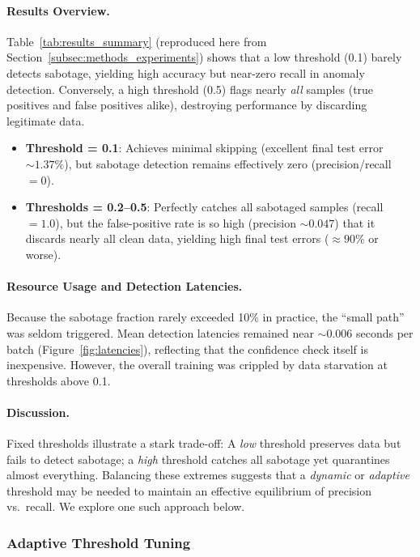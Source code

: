 \documentclass[12pt]{article}
\begin{document}
\paragraph{Results Overview.}
Table~\ref{tab:results_summary} (reproduced here from Section~\ref{subsec:methods_experiments})
shows that a low threshold (0.1) barely detects sabotage, yielding high accuracy
but near-zero recall in anomaly detection. Conversely, a high threshold (0.5)
flags nearly \emph{all} samples (true positives and false positives alike),
destroying performance by discarding legitimate data.

\begin{itemize}
  \item \textbf{Threshold = 0.1}:
    Achieves minimal skipping (excellent final test error $\sim1.37\%$),
    but sabotage detection remains effectively zero (precision/recall $=0$).
  \item \textbf{Thresholds = 0.2--0.5}:
    Perfectly catches all sabotaged samples (recall $=1.0$),
    but the false-positive rate is so high (precision $\sim0.047$)
    that it discards nearly all clean data,
    yielding high final test errors ($\approx 90\%$ or worse).
\end{itemize}

\paragraph{Resource Usage and Detection Latencies.}
Because the sabotage fraction rarely exceeded 10\% in practice, the
“small path” was seldom triggered. Mean detection latencies remained near
$\sim0.006$ seconds per batch (Figure~\ref{fig:latencies}), reflecting that
the confidence check itself is inexpensive. However, the overall training
was crippled by data starvation at thresholds above 0.1.

\paragraph{Discussion.}
Fixed thresholds illustrate a stark trade-off: A \emph{low} threshold preserves
data but fails to detect sabotage; a \emph{high} threshold catches all sabotage
yet quarantines almost everything. Balancing these extremes suggests that
a \emph{dynamic} or \emph{adaptive} threshold may be needed to maintain an
effective equilibrium of precision vs.\ recall. We explore one such
approach below.

\subsubsection{Adaptive Threshold Tuning}
\label{subsubsec:dynamic_threshold}
\end{document}
